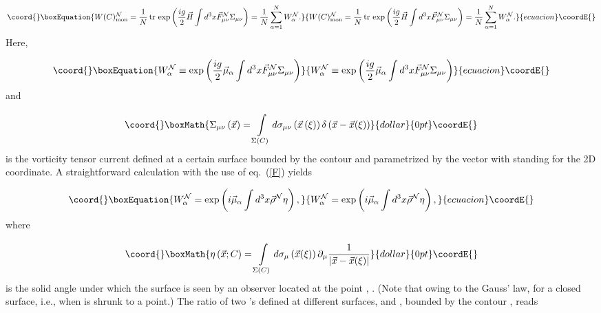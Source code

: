 \documentclass[a4paper,12pt]{article}
\begin{document}
\begin{equation}\coord{}\boxEquation{
\label{WcalN}
W(C)_{\rm mon}^{\cal N}=\frac{1}{N}{\,}{\rm tr}{\,}\exp\left(\frac{ig}{2}\vec H\int d^3x\vec F_{\mu\nu}^{\cal N}\Sigma_{\mu\nu}\right)=
\frac{1}{N}\sum\limits_{\alpha=1}^{N}W_\alpha^{\cal N}.
}{
W(C)_{\rm mon}^{\cal N}=\frac{1}{N}{\,}{\rm tr}{\,}\exp\left(\frac{ig}{2}\vec H\int d^3x\vec F_{\mu\nu}^{\cal N}\Sigma_{\mu\nu}\right)=
\frac{1}{N}\sum\limits_{\alpha=1}^{N}W_\alpha^{\cal N}.
}{ecuacion}\coordE{}\end{equation}
Here,

\begin{equation}\coord{}\boxEquation{
\label{Wa}
W_\alpha^{\cal N}\equiv\exp\left(\frac{ig}{2}\vec\mu_\alpha\int d^3x\vec F_{\mu\nu}^{\cal N}\Sigma_{\mu\nu}\right)
}{
W_\alpha^{\cal N}\equiv\exp\left(\frac{ig}{2}\vec\mu_\alpha\int d^3x\vec F_{\mu\nu}^{\cal N}\Sigma_{\mu\nu}\right)
}{ecuacion}\coordE{}\end{equation}
and

$$\coord{}\boxMath{\Sigma_{\mu\nu}\left(\vec x\right)=\int\limits_{\Sigma(C)}^{}
d\sigma_{\mu\nu}\left(\vec x\left(\xi\right)\right)\delta\left(\vec x-\vec x(\xi)\right)}{dollar}{0pt}\coordE{}$$
is the vorticity tensor current defined at a certain surface
\coordHE{} bounded by the contour \coordHE{} and parametrized by the vector
\coordHE{} with \coordHE{} standing for the 2D coordinate.
A straightforward calculation with the use of eq.~(\ref{F}) yields

\begin{equation}\coord{}\boxEquation{
\label{W}
W_\alpha^{\cal N}=\exp\left(i\vec\mu_\alpha\int d^3x\vec\rho^{\cal N}\eta\right),
}{
W_\alpha^{\cal N}=\exp\left(i\vec\mu_\alpha\int d^3x\vec\rho^{\cal N}\eta\right),
}{ecuacion}\coordE{}\end{equation}
where

$$\coord{}\boxMath{
\eta\left(\vec x; C\right)=\int\limits_{\Sigma(C)}^{}
d\sigma_\mu\left(\vec x(\xi)\right)\partial_\mu\frac{1}{\left|\vec x-\vec x(\xi)\right|}}{dollar}{0pt}\coordE{}$$
is the solid angle under which the surface \coordHE{} is seen by an observer located at the point \coordHE{}, \coordHE{}. (Note that owing to
the Gauss' law, \coordHE{} for a closed surface, i.e., when \coordHE{} is shrunk to a point.) The ratio of two \coordHE{}'s
defined at different surfaces, \coordHE{} and \coordHE{}, bounded by the contour \coordHE{}, reads
\end{document}
